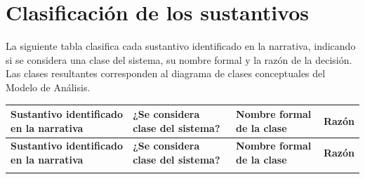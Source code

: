 \documentclass[11pt,letterpaper,oneside]{report}
\begin{document}
\section{Clasificación de los sustantivos}\label{sec:tablas-sustantivos}

La siguiente tabla clasifica cada sustantivo identificado en la narrativa, indicando
si se considera una clase del sistema, su nombre formal y la razón de la decisión.
Las clases resultantes corresponden al diagrama de clases conceptuales del Modelo de
Análisis.

\begingroup
{}
\renewcommand{\arraystretch}{1.3}
\small
\begin{longtable}{|L{3.5cm}|C{2.0cm}|L{3.3cm}|L{5.4cm}|}
\hline
{}
\textbf{Sustantivo identificado en la narrativa} &
\textbf{¿Se considera clase del sistema?} &
\textbf{Nombre formal de la clase} &
\textbf{Razón} \\
\hline
\endfirsthead
\hline
{}
\textbf{Sustantivo identificado en la narrativa} &
\textbf{¿Se considera clase del sistema?} &
\textbf{Nombre formal de la clase} &
\textbf{Razón} \\
\hline
\endhead
\hline
\endfoot
\hline
\endlastfoot


\end{longtable}
\end{document}
